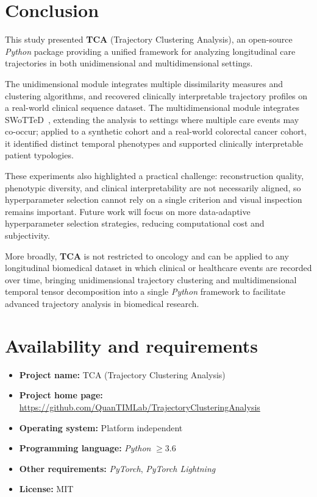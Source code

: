 \documentclass[a4paper]{cas-sc}
\newcommand{\proglang}[1]{\textit{#1}}
\newcommand{\pkg}[1]{\textbf{#1}}
\begin{document}
\section{Conclusion}\label{sec:conclusion}

This study presented \pkg{TCA} (Trajectory Clustering Analysis), an open-source \proglang{Python} package providing a unified framework for analyzing longitudinal care trajectories in both unidimensional and multidimensional settings.
 
The unidimensional module integrates multiple dissimilarity measures and clustering algorithms, and recovered clinically interpretable trajectory profiles on a real-world clinical sequence dataset. The multidimensional module integrates SWoTTeD~\cite{sebia2024swotted}, extending the analysis to settings where multiple care events may co-occur; applied to a synthetic cohort and a real-world colorectal cancer cohort, it identified distinct temporal phenotypes and supported clinically interpretable patient typologies.
 
These experiments also highlighted a practical challenge: reconstruction quality, phenotypic diversity, and clinical interpretability are not necessarily aligned, so hyperparameter selection cannot rely on a single criterion and visual inspection remains important. Future work will focus on more data-adaptive hyperparameter selection strategies, reducing computational cost and subjectivity.
 
More broadly, \pkg{TCA} is not restricted to oncology and can be applied to any longitudinal biomedical dataset in which clinical or healthcare events are recorded over time, bringing unidimensional trajectory clustering and multidimensional temporal tensor decomposition into a single \proglang{Python} framework to facilitate advanced trajectory analysis in biomedical research.

\section*{Availability and requirements}
\begin{itemize}
  \item \textbf{Project name:} TCA (Trajectory Clustering Analysis)
  \item \textbf{Project home page:}
        \url{https://github.com/QuanTIMLab/TrajectoryClusteringAnalysis}
  \item \textbf{Operating system:} Platform independent
  \item \textbf{Programming language:} \proglang{Python} $\geq 3.6$
  \item \textbf{Other requirements:} \proglang{PyTorch}, \proglang{PyTorch Lightning}
  \item \textbf{License:} MIT
\end{itemize}
\end{document}
